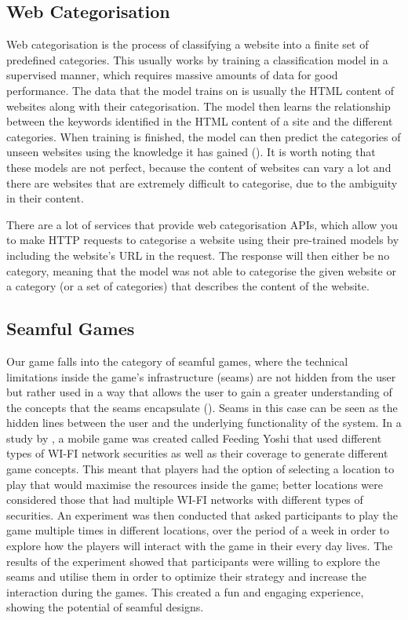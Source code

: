 \documentclass{l4proj}
\begin{document}
\subsection{Web Categorisation}
Web categorisation is the process of classifying a website into a finite set of predefined categories. This usually works by training a classification model in a supervised manner, which requires massive amounts of data for good performance. The data that the model trains on is usually the HTML content of websites along with their categorisation. The model then learns the relationship between the keywords identified in the HTML content of a site and the different categories. When training is finished, the model can then predict the categories of unseen websites using the knowledge it has gained (\cite{webcat}). It is worth noting that these models are not perfect, because the content of websites can vary a lot and there are websites that are extremely difficult to categorise, due to the ambiguity in their content. 

There are a lot of services that provide web categorisation APIs, which allow you to make HTTP requests to categorise a website using their pre-trained models by including the website's URL in the request. The response will then either be no category, meaning that the model was not able to categorise the given website or a category (or a set of categories) that describes the content of the website.

\subsection{Seamful Games}
Our game falls into the category of seamful games, where the technical limitations inside the game's infrastructure (seams) are not hidden from the user but rather used in a way that allows the user to gain a greater understanding of the concepts that the seams encapsulate (\cite{seams1}). Seams in this case can be seen as the hidden lines between the user and the underlying functionality of the system. In a study by \cite{yoshi}, a mobile game was created called Feeding Yoshi that used different types of WI-FI network securities as well as their coverage to generate different game concepts. This meant that players had the option of selecting a location to play that would maximise the resources inside the game; better locations were considered those that had multiple WI-FI networks with different types of securities. An experiment was then conducted that asked participants to play the game multiple times in different locations, over the period of a week in order to explore how the players will interact with the game in their every day lives. The results of the experiment showed that participants were willing to explore the seams and utilise them in order to optimize their strategy and increase the interaction during the games. This created a fun and engaging experience, showing the potential of seamful designs.
\end{document}

